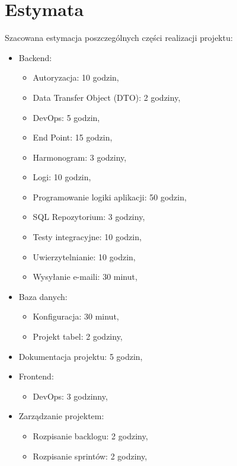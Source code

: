 \documentclass[12pt,a4paper]{article}
\begin{document}
	\section{Estymata}
		\indent Szacowana estymacja poszczególnych części realizacji projektu:
		\begin{itemize}
			\item Backend:
				\begin{itemize}
					\item Autoryzacja: 10 godzin,
					\item Data Transfer Object (DTO): 2 godziny,
					\item DevOps: 5 godzin,
					\item End Point: 15 godzin,
					\item Harmonogram: 3 godziny,
					\item Logi: 10 godzin,
					\item Programowanie logiki aplikacji: 50 godzin,
					\item SQL Repozytorium: 3 godziny,
					\item Testy integracyjne: 10 godzin,
					\item Uwierzytelnianie: 10 godzin, 
					\item Wysyłanie e-maili: 30 minut,
				\end{itemize}
			\item Baza danych:
				\begin{itemize}
					\item Konfiguracja: 30 minut,
					\item Projekt tabel: 2 godziny,
				\end{itemize}
			\item Dokumentacja projektu: 5 godzin,
			\item Frontend: 
				\begin{itemize}
					\item DevOps: 3 godzinny,
				\end{itemize}
			\item Zarządzanie projektem:
				\begin{itemize}
					\item Rozpisanie backlogu: 2 godziny,
					\item Rozpisanie sprintów: 2 godziny,
				\end{itemize}
		\end{itemize}				

	\newpage

\end{document}
